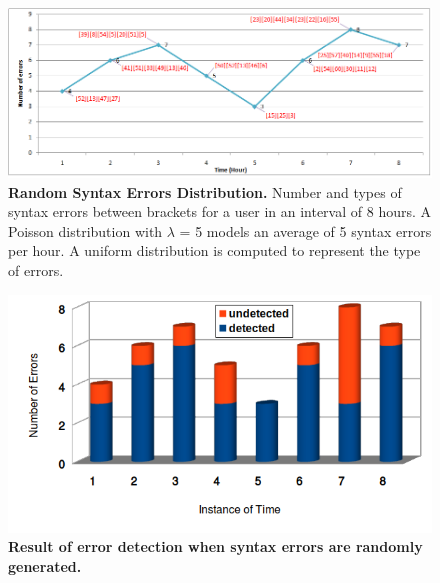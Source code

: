 	\begin{figure}[ht]
	\begin{center}
		\includegraphics[scale=0.58,angle=0]{images/experiment2.png}
				\setlength\belowcaptionskip{-5mm}
		\caption{\textbf{Random Syntax Errors Distribution.} Number and types of syntax errors between brackets for a user in an interval of 8 hours. A Poisson  distribution with $\lambda$ = 5 models an average of 5 syntax errors per hour. A uniform distribution is computed to represent the type of errors.} 
		\label{Fig:experiment2}
	\end{center}
\end{figure}



	\begin{figure}[ht]
	\begin{center}
		\includegraphics[scale=0.8,angle=0]{images/Experiment02-02.png}
				\setlength\belowcaptionskip{-5mm}
		\caption{\textbf{Result of error detection when syntax errors are randomly generated.}} 
		\label{Fig:Experiment02-02}
	\end{center}
\end{figure}

